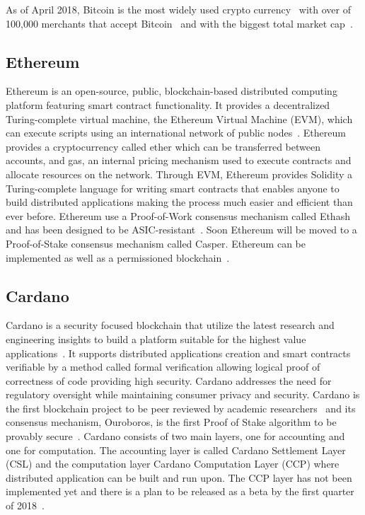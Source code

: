 As of April 2018, Bitcoin is the most widely used crypto currency~\cite{10.1007/978-3-642-39884-1_2} with over of 100,000 merchants that accept Bitcoin~\cite{btc_merchants} and with the biggest total market cap~\cite{btc_cap}.

\subsection{Ethereum}\label{blockchain:impl:ethereum}

Ethereum is an open-source, public, blockchain-based distributed computing platform featuring smart contract functionality.
It provides a decentralized Turing-complete virtual machine, the Ethereum Virtual Machine (EVM), which can execute scripts using an
international network of public nodes~\cite{ethereum_yellowpaper}. Ethereum provides a cryptocurrency called ether which can be transferred between accounts, and gas, an internal pricing mechanism used to execute contracts and allocate resources on the network. Through EVM, Ethereum provides Solidity a Turing-complete language for writing smart contracts that enables anyone to build distributed applications making the process much easier and efficient than ever before. Ethereum use a Proof-of-Work consensus mechanism called Ethash and has been designed to be ASIC-resistant~\cite{ethash}.
Soon Ethereum will be moved to a Proof-of-Stake consensus mechanism called Casper. Ethereum can be implemented as well as a permissioned blockchain~\cite{consortium_chain_development,quorum}.

\subsection{Cardano}\label{blockchain:impl:cardano}

Cardano is a security focused blockchain that utilize the latest research and engineering insights to build a platform suitable for
the highest value applications~\cite{cardano_site}. It supports distributed applications creation and smart contracts verifiable by a method called formal
verification allowing logical proof of correctness of code providing high security. Cardano addresses the need for regulatory oversight while
maintaining consumer privacy and security. Cardano is the first blockchain project to be peer reviewed by academic researchers~\cite{cardano_site} and its consensus
mechanism, Ouroboros, is the first Proof of Stake algorithm to be provably secure~\cite{Kiayias2017}.
Cardano consists of two main layers, one for accounting and one for computation. The accounting layer is called Cardano Settlement Layer (CSL)
and the computation layer Cardano Computation Layer (CCP) where distributed application can be built and run upon. The CCP layer has not been
implemented yet and there is a plan to be released as a beta by the first quarter of 2018~\cite{cardano_parsons}.
